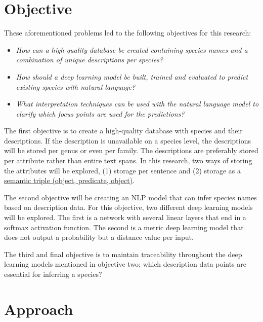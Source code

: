 \documentclass[a4paper, 12pt, oneside]{book} %
\begin{document}
\section{Objective}
These aforementioned problems led to the following objectives for this research:
\noindent 
\begin{itemize}
    
    \item \emph{How can a high-quality database be created containing species names and a combination of unique descriptions per species?}
    
    \item \emph{How should a deep learning model be built, trained and evaluated to predict existing species with natural language?}

    \item \emph{What interpretation techniques can be used with the natural language model to clarify which focus points are used for the predictions?}

\end{itemize}

The first objective is to create a high-quality database with species and their descriptions.
If the description is unavailable on a species level, the descriptions will be stored per genus or even per family.
The descriptions are preferably stored per attribute rather than entire text spans.
In this research, two ways of storing the attributes will be explored, (1) storage per sentence and (2) storage as a \href{https://www.ontotext.com/knowledgehub/fundamentals/what-is-a-knowledge-graph/}{semantic triple (object, predicate, object)}.

The second objective will be creating an NLP model that can infer species names based on description data. 
For this objective, two different deep learning models will be explored.
The first is a network with several linear layers that end in a softmax activation function.
The second is a metric deep learning model that does not output a probability but a distance value per input.

The third and final objective is to maintain traceability throughout the deep learning models mentioned in objective two; which description data points are essential for inferring a species?
\section{Approach} 
\end{document}
